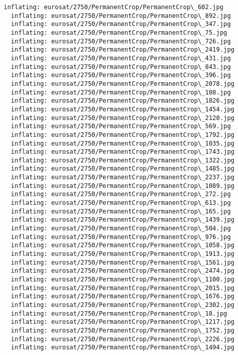 \documentclass[11pt]{article}
\begin{document}
\begin{Verbatim}[commandchars=\\\{\}]
  inflating: eurosat/2750/PermanentCrop/PermanentCrop\_602.jpg
  inflating: eurosat/2750/PermanentCrop/PermanentCrop\_892.jpg
  inflating: eurosat/2750/PermanentCrop/PermanentCrop\_347.jpg
  inflating: eurosat/2750/PermanentCrop/PermanentCrop\_75.jpg
  inflating: eurosat/2750/PermanentCrop/PermanentCrop\_726.jpg
  inflating: eurosat/2750/PermanentCrop/PermanentCrop\_2419.jpg
  inflating: eurosat/2750/PermanentCrop/PermanentCrop\_431.jpg
  inflating: eurosat/2750/PermanentCrop/PermanentCrop\_843.jpg
  inflating: eurosat/2750/PermanentCrop/PermanentCrop\_396.jpg
  inflating: eurosat/2750/PermanentCrop/PermanentCrop\_2078.jpg
  inflating: eurosat/2750/PermanentCrop/PermanentCrop\_108.jpg
  inflating: eurosat/2750/PermanentCrop/PermanentCrop\_1826.jpg
  inflating: eurosat/2750/PermanentCrop/PermanentCrop\_1454.jpg
  inflating: eurosat/2750/PermanentCrop/PermanentCrop\_2120.jpg
  inflating: eurosat/2750/PermanentCrop/PermanentCrop\_569.jpg
  inflating: eurosat/2750/PermanentCrop/PermanentCrop\_1792.jpg
  inflating: eurosat/2750/PermanentCrop/PermanentCrop\_1035.jpg
  inflating: eurosat/2750/PermanentCrop/PermanentCrop\_1743.jpg
  inflating: eurosat/2750/PermanentCrop/PermanentCrop\_1322.jpg
  inflating: eurosat/2750/PermanentCrop/PermanentCrop\_1485.jpg
  inflating: eurosat/2750/PermanentCrop/PermanentCrop\_2237.jpg
  inflating: eurosat/2750/PermanentCrop/PermanentCrop\_1089.jpg
  inflating: eurosat/2750/PermanentCrop/PermanentCrop\_272.jpg
  inflating: eurosat/2750/PermanentCrop/PermanentCrop\_613.jpg
  inflating: eurosat/2750/PermanentCrop/PermanentCrop\_165.jpg
  inflating: eurosat/2750/PermanentCrop/PermanentCrop\_1439.jpg
  inflating: eurosat/2750/PermanentCrop/PermanentCrop\_504.jpg
  inflating: eurosat/2750/PermanentCrop/PermanentCrop\_976.jpg
  inflating: eurosat/2750/PermanentCrop/PermanentCrop\_1058.jpg
  inflating: eurosat/2750/PermanentCrop/PermanentCrop\_1913.jpg
  inflating: eurosat/2750/PermanentCrop/PermanentCrop\_1561.jpg
  inflating: eurosat/2750/PermanentCrop/PermanentCrop\_2474.jpg
  inflating: eurosat/2750/PermanentCrop/PermanentCrop\_1100.jpg
  inflating: eurosat/2750/PermanentCrop/PermanentCrop\_2015.jpg
  inflating: eurosat/2750/PermanentCrop/PermanentCrop\_1676.jpg
  inflating: eurosat/2750/PermanentCrop/PermanentCrop\_2302.jpg
  inflating: eurosat/2750/PermanentCrop/PermanentCrop\_18.jpg
  inflating: eurosat/2750/PermanentCrop/PermanentCrop\_1217.jpg
  inflating: eurosat/2750/PermanentCrop/PermanentCrop\_1752.jpg
  inflating: eurosat/2750/PermanentCrop/PermanentCrop\_2226.jpg
  inflating: eurosat/2750/PermanentCrop/PermanentCrop\_1494.jpg

\end{Verbatim}
\end{document}
